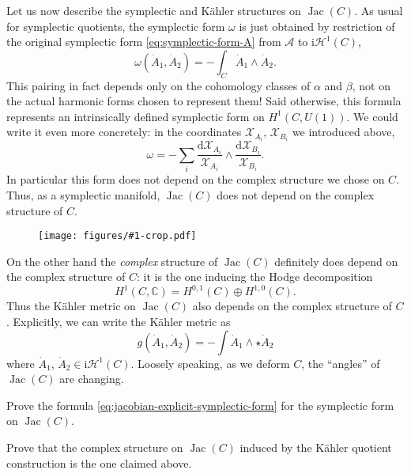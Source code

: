 \documentclass[12pt,letterpaper,reqno]{article}
\numberwithin{equation}{section}
\newcommand{\cH}{\ensuremath{\mathcal H}}
\newcommand{\cX}{\ensuremath{\mathcal X}}
\newcommand{\cA}{\ensuremath{\mathcal A}}
\newcommand{\C}{\ensuremath{\mathbb C}}
\newcommand{\kahler}{K\"ahler\xspace}
\newcommand{\I}{{\mathrm i}}
\newcommand{\de}{\mathrm{d}}
\newcommand{\ti}[1]{\textit{#1}}
\DeclareMathOperator{\Jac}{Jac}
\newcommand{\insfig}[2]{\begin{figure}[htbp] \centering \texttt{[image: figures/\#1-crop.pdf]} \label{fig:#1} \end{figure}}
\begin{document}
\begin{example}[Jacobians]
Let us now describe the symplectic and \kahler structures
on $\Jac(C)$.
As usual for symplectic quotients, 
the symplectic form $\omega$ is just obtained by
restriction of the original symplectic form \eqref{eq:symplectic-form-A}
from $\cA$ to $\I \cH^1(C)$,
\begin{equation} \label{eq:symplectic-form-jac}
  \omega(\dot{A}_1, \dot{A}_2) = - \int_C \dot{A}_1 \wedge \dot{A}_2.
\end{equation}
This pairing in fact depends only on the cohomology classes of
$\alpha$ and $\beta$, not on the actual harmonic forms
chosen to represent them! Said otherwise, this formula represents
an intrinsically defined symplectic form on $H^1(C,U(1))$.
We could write it even more concretely: in the coordinates
$\cX_{A_i}$, $\cX_{B_i}$ we introduced above,
\begin{equation} \label{eq:jacobian-explicit-symplectic-form}
	\omega = - \sum_i \frac{\de \cX_{A_i}}{\cX_{A_i}} \wedge \frac{\de \cX_{B_i}}{\cX_{B_i}}.
\end{equation}
In particular this form does not depend on the complex structure
we chose on $C$.
Thus, as a symplectic manifold, $\Jac(C)$ does not depend on
the complex structure of $C$.

\insfig{higgs-bundles-14}{0.9}

On the other hand the
\ti{complex} structure of $\Jac(C)$ 
definitely does depend on the complex
structure of $C$: it is the one inducing the 
Hodge decomposition
\begin{equation}
  H^1(C,\C) = H^{0,1}(C) \oplus H^{1,0}(C).
\end{equation}
Thus the \kahler metric on $\Jac(C)$
also depends on the complex structure of $C$.
Explicitly, we can write the \kahler metric as
\begin{equation}
  g(\dot{A}_1, \dot{A}_2) = - \int \dot{A}_1 \wedge \star \dot{A}_2
\end{equation}
where $\dot{A}_1$, $\dot{A}_2 \in \I \cH^1(C)$.
Loosely speaking, as we deform $C$, the ``angles'' of $\Jac(C)$
are changing.
\end{example}

\begin{exercise} Prove the formula \eqref{eq:jacobian-explicit-symplectic-form}
for the symplectic form on $\Jac(C)$.
\end{exercise}

\begin{exercise}
Prove that the complex structure on $\Jac(C)$
induced by the \kahler quotient construction is the 
one claimed above.
\end{exercise}
\end{document}
